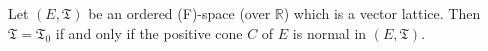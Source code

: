 Let $(E, \mathfrak{T})$ be an ordered (F)-space (over $\mathbb{R}$) which is a vector lattice. Then $\mathfrak{T} = \mathfrak{T}_0$ if and only if the positive cone $C$ of $E$ is normal in $(E, \mathfrak{T})$.
